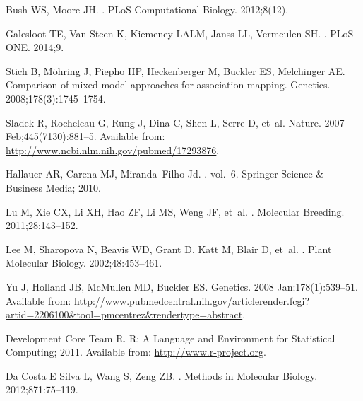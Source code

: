\documentclass[10pt,letterpaper]{article}
\begin{document}
\begin{thebibliography}{10}
Bush WS, Moore JH.
.
\newblock PLoS Computational Biology. 2012;8(12).

Galesloot TE, {Van Steen} K, Kiemeney LALM, Janss LL, Vermeulen SH.
.
\newblock PLoS ONE. 2014;9.

Stich B, M{\"o}hring J, Piepho HP, Heckenberger M, Buckler ES, Melchinger AE.
\newblock Comparison of mixed-model approaches for association mapping.
\newblock Genetics. 2008;178(3):1745--1754.

Sladek R, Rocheleau G, Rung J, Dina C, Shen L, Serre D, et~al.
\newblock Nature. 2007 Feb;445(7130):881--5.
\newblock Available from: \url{http://www.ncbi.nlm.nih.gov/pubmed/17293876}.

Hallauer AR, Carena MJ, Miranda~Filho Jd.
. vol.~6.
\newblock Springer Science \& Business Media; 2010.

Lu M, Xie CX, Li XH, Hao ZF, Li MS, Weng JF, et~al.
.
\newblock Molecular Breeding. 2011;28:143--152.

Lee M, Sharopova N, Beavis WD, Grant D, Katt M, Blair D, et~al.
.
\newblock Plant Molecular Biology. 2002;48:453--461.

Yu J, Holland JB, McMullen MD, Buckler ES.
\newblock Genetics. 2008 Jan;178(1):539--51.
\newblock Available from:
  \url{http://www.pubmedcentral.nih.gov/articlerender.fcgi?artid=2206100\&tool=pmcentrez\&rendertype=abstract}.

{Development Core Team} R. {R: A Language and Environment for Statistical
  Computing}; 2011.
\newblock Available from: \url{http://www.r-project.org}.

{Da Costa E  Silva} L, Wang S, Zeng ZB.
.
\newblock Methods in Molecular Biology. 2012;871:75--119.


\end{thebibliography}
\end{document}
